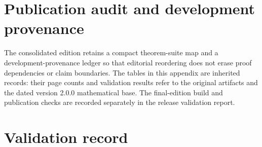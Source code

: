 \documentclass[11pt]{article}
\theoremstyle{definition}
\theoremstyle{remark}
\begin{document}
\clearpage
\section{Publication audit and development provenance}
\label{app:block15-publication-audit}

The consolidated edition retains a compact theorem-suite map and a development-provenance ledger so that editorial reordering does not erase proof dependencies or claim boundaries. The tables in this appendix are inherited records: their page counts and validation results refer to the original artifacts and the dated version 2.0.0 mathematical base. The final-edition build and publication checks are recorded separately in the release validation report.








\clearpage


\clearpage


\clearpage
\section{Validation record}
\end{document}
